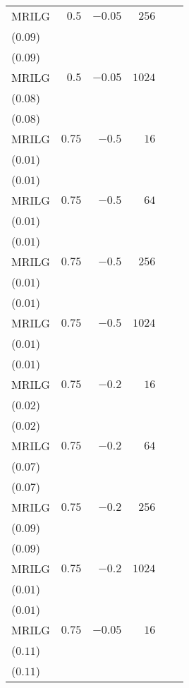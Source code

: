 \begin{table}[t]
\begin{tabular}{lrrrrr}
MRILG & \(0.5\) & \(-0.05\) & \(256\) & \longcell{\(0.17\)\\{\tiny(\(0.09\))}} & \longcell{\(0.17\)\\{\tiny(\(0.09\))}} \\[2.2ex]
MRILG & \(0.5\) & \(-0.05\) & \(1024\) & \longcell{\(0.15\)\\{\tiny(\(0.08\))}} & \longcell{\(0.15\)\\{\tiny(\(0.08\))}} \\[2.2ex]
MRILG & \(0.75\) & \(-0.5\) & \(16\) & \longcell{\(0.23\)\\{\tiny(\(0.01\))}} & \longcell{\(0.23\)\\{\tiny(\(0.01\))}} \\[2.2ex]
MRILG & \(0.75\) & \(-0.5\) & \(64\) & \longcell{\(0.23\)\\{\tiny(\(0.01\))}} & \longcell{\(0.23\)\\{\tiny(\(0.01\))}} \\[2.2ex]
MRILG & \(0.75\) & \(-0.5\) & \(256\) & \longcell{\(0.21\)\\{\tiny(\(0.01\))}} & \longcell{\(0.21\)\\{\tiny(\(0.01\))}} \\[2.2ex]
MRILG & \(0.75\) & \(-0.5\) & \(1024\) & \longcell{\(0.18\)\\{\tiny(\(0.01\))}} & \longcell{\(0.18\)\\{\tiny(\(0.01\))}} \\[2.2ex]
MRILG & \(0.75\) & \(-0.2\) & \(16\) & \longcell{\(0.23\)\\{\tiny(\(0.02\))}} & \longcell{\(0.23\)\\{\tiny(\(0.02\))}} \\[2.2ex]
MRILG & \(0.75\) & \(-0.2\) & \(64\) & \longcell{\(0.19\)\\{\tiny(\(0.07\))}} & \longcell{\(0.19\)\\{\tiny(\(0.07\))}} \\[2.2ex]
MRILG & \(0.75\) & \(-0.2\) & \(256\) & \longcell{\(0.17\)\\{\tiny(\(0.09\))}} & \longcell{\(0.17\)\\{\tiny(\(0.09\))}} \\[2.2ex]
MRILG & \(0.75\) & \(-0.2\) & \(1024\) & \longcell{\(0.19\)\\{\tiny(\(0.01\))}} & \longcell{\(0.19\)\\{\tiny(\(0.01\))}} \\[2.2ex]
MRILG & \(0.75\) & \(-0.05\) & \(16\) & \longcell{\(0.13\)\\{\tiny(\(0.11\))}} & \longcell{\(0.13\)\\{\tiny(\(0.11\))}} \\[2.2ex]

\end{tabular}
\end{table}
